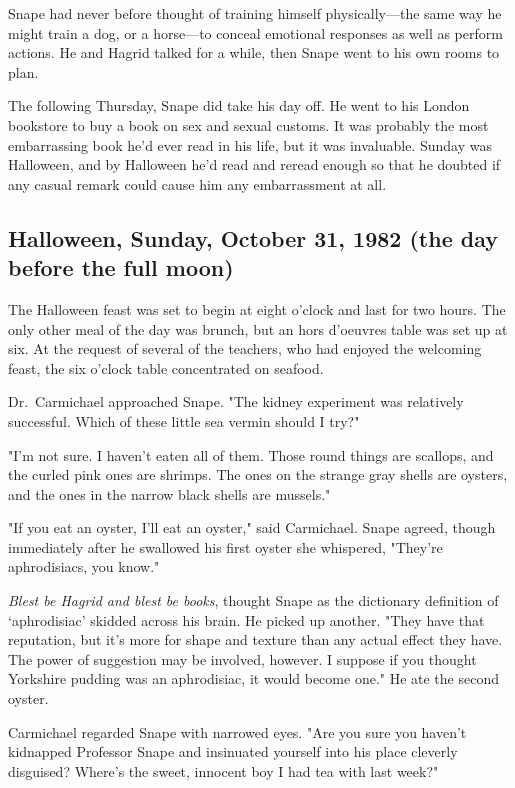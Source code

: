 Snape had never before thought of training himself physically—the same way he might train a dog, or a horse—to conceal emotional responses as well as perform actions. He and Hagrid talked for a while, then Snape went to his own rooms to plan.

The following Thursday, Snape did take his day off. He went to his London bookstore to buy a book on sex and sexual customs. It was probably the most embarrassing book he'd ever read in his life, but it was invaluable. Sunday was Halloween, and by Halloween he'd read and reread enough so that he doubted if any casual remark could cause him any embarrassment at all.

\subsection{Halloween, Sunday, October 31, 1982 (the day before the full moon)}

The Halloween feast was set to begin at eight o'clock and last for two hours. The only other meal of the day was brunch, but an hors d'oeuvres table was set up at six. At the request of several of the teachers, who had enjoyed the welcoming feast, the six o'clock table concentrated on seafood.

Dr.~Carmichael approached Snape. "The kidney experiment was relatively successful. Which of these little sea vermin should I try?"

"I'm not sure. I haven't eaten all of them. Those round things are scallops, and the curled pink ones are shrimps. The ones on the strange gray shells are oysters, and the ones in the narrow black shells are mussels."

"If you eat an oyster, I'll eat an oyster," said Carmichael. Snape agreed, though immediately after he swallowed his first oyster she whispered, "They're aphrodisiacs, you know."

\emph{Blest be Hagrid and blest be books}, thought Snape as the dictionary definition of `aphrodisiac' skidded across his brain. He picked up another. "They have that reputation, but it's more for shape and texture than any actual effect they have. The power of suggestion may be involved, however. I suppose if you thought Yorkshire pudding was an aphrodisiac, it would become one." He ate the second oyster.

Carmichael regarded Snape with narrowed eyes. "Are you sure you haven't kidnapped Professor Snape and insinuated yourself into his place cleverly disguised? Where's the sweet, innocent boy I had tea with last week?"

